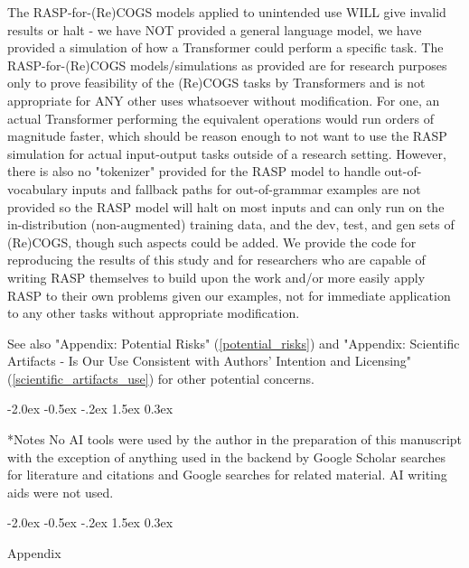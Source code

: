 \documentclass[11pt]{article}
\makeatletter
\renewcommand\section{\@startsection{section}{1}{\z@}%
                                  {-2.0ex \@plus -0.5ex \@minus -.2ex}%
                                  {1.5ex \@plus 0.3ex}%
                                  {\large\bfseries\raggedright}}
\makeatother
\begin{document}
The RASP-for-(Re)COGS models applied to unintended use WILL give invalid results or halt - we have NOT provided a general language model, we have provided a simulation of how a Transformer could perform a specific task.
The RASP-for-(Re)COGS models/simulations as provided are for research purposes only to prove feasibility of the (Re)COGS tasks by Transformers and is not appropriate for ANY other uses whatsoever without modification. For one, an actual Transformer performing the equivalent operations would run orders of magnitude faster, which should be reason enough to not want to use the RASP simulation for actual input-output tasks outside of a research setting. However, there is also no "tokenizer" provided for the RASP model to handle out-of-vocabulary inputs and fallback paths for out-of-grammar examples are not provided so the RASP model will halt on most inputs and can only run on the in-distribution (non-augmented) training data, and the dev, test, and gen sets of (Re)COGS, though such aspects could be added. We provide the code for reproducing the results of this study and for researchers who are capable of writing RASP themselves to build upon the work and/or more easily apply RASP to their own problems given our examples, not for immediate application to any other tasks without appropriate modification.

See also "Appendix: Potential Risks" (\ref{potential_risks}) and "Appendix: Scientific Artifacts - Is Our Use Consistent with Authors' Intention and Licensing" (\ref{scientific_artifacts_use}) for other potential concerns.




\section*{Notes}
No AI tools were used by the author in the preparation of this manuscript with the exception of anything used in the backend by Google Scholar searches for literature and citations and Google searches for related material. AI writing aids were not used.

\section{Appendix}
\end{document}
